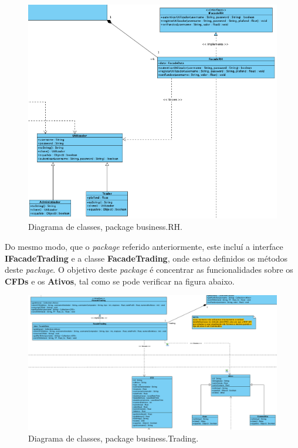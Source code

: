 \documentclass[11pt,a4paper]{report}%
\begin{document}
\begin{figure}[H]
	\centering
	\includegraphics[scale=0.5]{diagrama-classes-2.png}
	\caption{Diagrama de classes, package business.RH. }
	\label{img:pag}
\end{figure}

Do mesmo modo, que o \emph{package} referido anteriormente, este incluí a interface \textbf{IFacadeTrading} e a classe \textbf{FacadeTrading}, onde estao definidos os métodos deste \emph{package}. O objetivo deste \emph{package} é concentrar as funcionalidades sobre os \textbf{CFDs} e os \textbf{Ativos}, tal como se pode verificar na figura abaixo. 

\begin{figure}[H]
	\centering
	\includegraphics[scale=0.5]{diagrama-classes-3.png}
	\caption{Diagrama de classes, package business.Trading. }
	\label{img:pag}
\end{figure}
\end{document}
